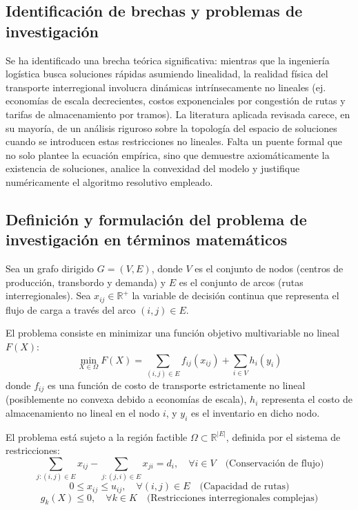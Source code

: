 \subsection{Identificación de brechas y problemas de investigación}
Se ha identificado una brecha teórica significativa: mientras que la ingeniería logística busca soluciones rápidas asumiendo linealidad, la realidad física del transporte interregional involucra dinámicas intrínsecamente no lineales (ej. economías de escala decrecientes, costos exponenciales por congestión de rutas y tarifas de almacenamiento por tramos). La literatura aplicada revisada carece, en su mayoría, de un análisis riguroso sobre la topología del espacio de soluciones cuando se introducen estas restricciones no lineales. Falta un puente formal que no solo plantee la ecuación empírica, sino que demuestre axiomáticamente la existencia de soluciones, analice la convexidad del modelo y justifique numéricamente el algoritmo resolutivo empleado.

\subsection{Definición y formulación del problema de investigación en términos matemáticos}
Sea un grafo dirigido $G = (V, E)$, donde $V$ es el conjunto de nodos (centros de producción, transbordo y demanda) y $E$ es el conjunto de arcos (rutas interregionales). Sea $x_{ij} \in \mathbb{R}^{+}$ la variable de decisión continua que representa el flujo de carga a través del arco $(i,j) \in E$. 

El problema consiste en minimizar una función objetivo multivariable no lineal $F(X)$:
\begin{equation}
    \min_{X \in \Omega} F(X) = \sum_{(i,j) \in E} f_{ij}(x_{ij}) + \sum_{i \in V} h_i(y_i)
\end{equation}
donde $f_{ij}$ es una función de costo de transporte estrictamente no lineal (posiblemente no convexa debido a economías de escala), $h_i$ representa el costo de almacenamiento no lineal en el nodo $i$, y $y_i$ es el inventario en dicho nodo.

El problema está sujeto a la región factible $\Omega \subset \mathbb{R}^{|E|}$, definida por el sistema de restricciones:
\begin{equation}
    \sum_{j: (i,j) \in E} x_{ij} - \sum_{j: (j,i) \in E} x_{ji} = d_i, \quad \forall i \in V \quad \text{(Conservación de flujo)}
\end{equation}
\begin{equation}
    0 \leq x_{ij} \leq u_{ij}, \quad \forall (i,j) \in E \quad \text{(Capacidad de rutas)}
\end{equation}
\begin{equation}
    g_k(X) \leq 0, \quad \forall k \in K \quad \text{(Restricciones interregionales complejas)}
\end{equation}

